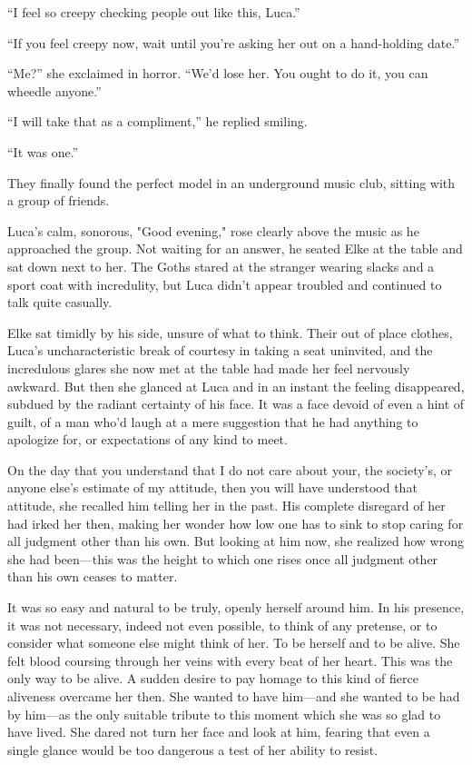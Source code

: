 ``I feel so creepy checking people out like this, Luca.''

``If you feel creepy now, wait until you're asking her out on a hand-holding date.''

``Me?'' she exclaimed in horror. ``We'd lose her. You ought to do it, you can wheedle anyone.''

``I will take that as a compliment,'' he replied smiling.

``It was one.''

They finally found the perfect model in an underground music club, sitting with a group of friends.

Luca's calm, sonorous, "Good evening," rose clearly above the music as he approached the group. Not waiting for an answer, he seated Elke at the table and sat down next to her. The Goths stared at the stranger wearing slacks and a sport coat with incredulity, but Luca didn't appear troubled and continued to talk quite casually.

Elke sat timidly by his side, unsure of what to think. Their out of place clothes, Luca's uncharacteristic break of courtesy in taking a seat uninvited, and the incredulous glares she now met at the table had made her feel nervously awkward. But then she glanced at Luca and in an instant the feeling disappeared, subdued by the radiant certainty of his face. It was a face devoid of even a hint of guilt, of a man who'd laugh at a mere suggestion that he had anything to apologize for, or expectations of any kind to meet.

On the day that you understand that I do not care about your, the society's, or anyone else's estimate of my attitude, then you will have understood that attitude, she recalled him telling her in the past. His complete disregard of her had irked her then, making her wonder how low one has to sink to stop caring for all judgment other than his own. But looking at him now, she realized how wrong she had been---this was the height to which one rises once all judgment other than his own ceases to matter.

It was so easy and natural to be truly, openly herself around him. In his presence, it was not necessary, indeed not even possible, to think of any pretense, or to consider what someone else might think of her. To be herself and to be alive. She felt blood coursing through her veins with every beat of her heart. This was the only way to be alive. A sudden desire to pay homage to this kind of fierce aliveness overcame her then. She wanted to have him---and she wanted to be had by him---as the only suitable tribute to this moment which she was so glad to have lived. She dared not turn her face and look at him, fearing that even a single glance would be too dangerous a test of her ability to resist.

